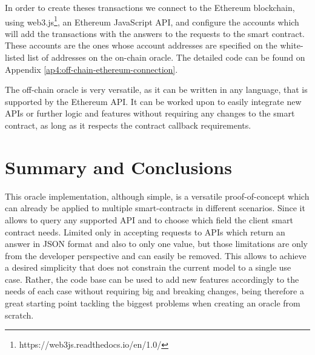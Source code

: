 In order to create theses transactions we connect to the Ethereum blockchain, using web3.js\footnote{https://web3js.readthedocs.io/en/1.0/}, an Ethereum JavaScript API, and configure the accounts which will add the transactions with the answers to the requests to the smart contract. These accounts are the ones whose account addresses are specified on the white-listed list of addresses on the on-chain oracle. The detailed code can be found on Appendix \ref{ap4:off-chain-ethereum-connection}.

The off-chain oracle is very versatile, as it can be written in any language, that is supported by the Ethereum API. It can be worked upon to easily integrate new APIs or further logic and features without requiring any changes to the smart contract, as long as it respects the contract callback requirements.

\section{Summary and Conclusions}

This oracle implementation, although simple, is a versatile proof-of-concept which can already be applied to multiple smart-contracts in different scenarios. Since it allows to query any supported API and to choose which field the client smart contract needs. Limited only in accepting requests to APIs which return an answer in JSON format and also to only one value, but those limitations are only from the developer perspective and can easily be removed. This allows to achieve a desired simplicity that does not constrain the current model to a single use case. Rather, the code base can be used to add new features accordingly to the needs of each case without requiring big and breaking changes, being therefore a great starting point tackling the biggest problems when creating an oracle from scratch.

